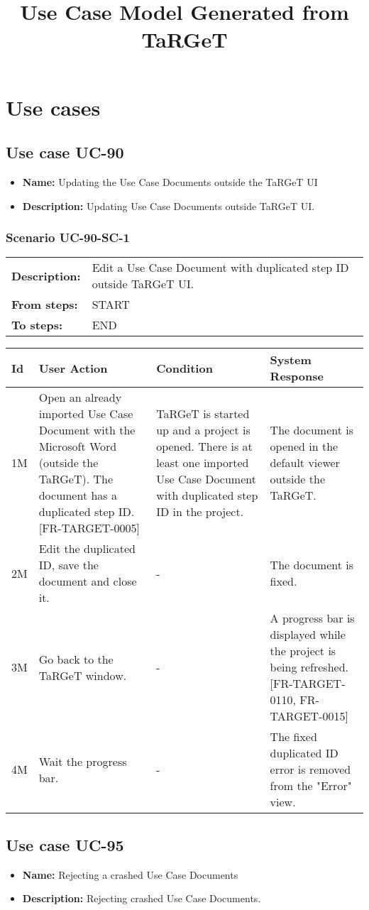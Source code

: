 \documentclass[a4paper,11pt]{article}
\title{Use Case Model Generated from TaRGeT}
\newcommand{\bl}{\\ \hline}
\begin{document}
\maketitle
\section*{Use cases}
\subsection*{Use case UC-90}
\begin{itemize}
\item {\bf Name: }Updating the Use Case Documents outside the TaRGeT UI
\item {\bf Description: }Updating Use Case Documents outside TaRGeT UI.
\end{itemize}
\subsubsection*{Scenario UC-90-SC-1}
\begin{tabular}{p{1in}p{4in}}
{\bf Description:} & Edit a Use Case Document with duplicated step ID outside TaRGeT UI. \\
{\bf From steps:} & START \\
{\bf To steps:} & END \\
\end{tabular}
 
\begin{tabular}{|p{0.8in}|p{1.6in}|p{1.6in}|p{1.6in}|}
\hline
Id & User Action & Condition & System Response  \bl 
1M & Open an already imported Use Case Document with the Microsoft Word (outside the TaRGeT). The document has a duplicated step ID. [FR-TARGET-0005] & TaRGeT is started up and a project is opened. There is at least one imported Use Case Document with duplicated step ID in the project. & The document is opened in the default viewer outside the TaRGeT. \bl 
2M & Edit the duplicated ID, save the document and close it. & - & The document is fixed. \bl 
3M & Go back to the TaRGeT window. & - & A progress bar is displayed while the project is being refreshed. [FR-TARGET-0110, FR-TARGET-0015] \bl 
4M & Wait the progress bar. & - & The fixed duplicated ID error is removed from the "Error" view. \bl 
\end{tabular}
\subsection*{Use case UC-95}
\begin{itemize}
\item {\bf Name: }Rejecting a crashed Use Case Documents
\item {\bf Description: }Rejecting crashed Use Case Documents.
\end{itemize}
\end{document}
